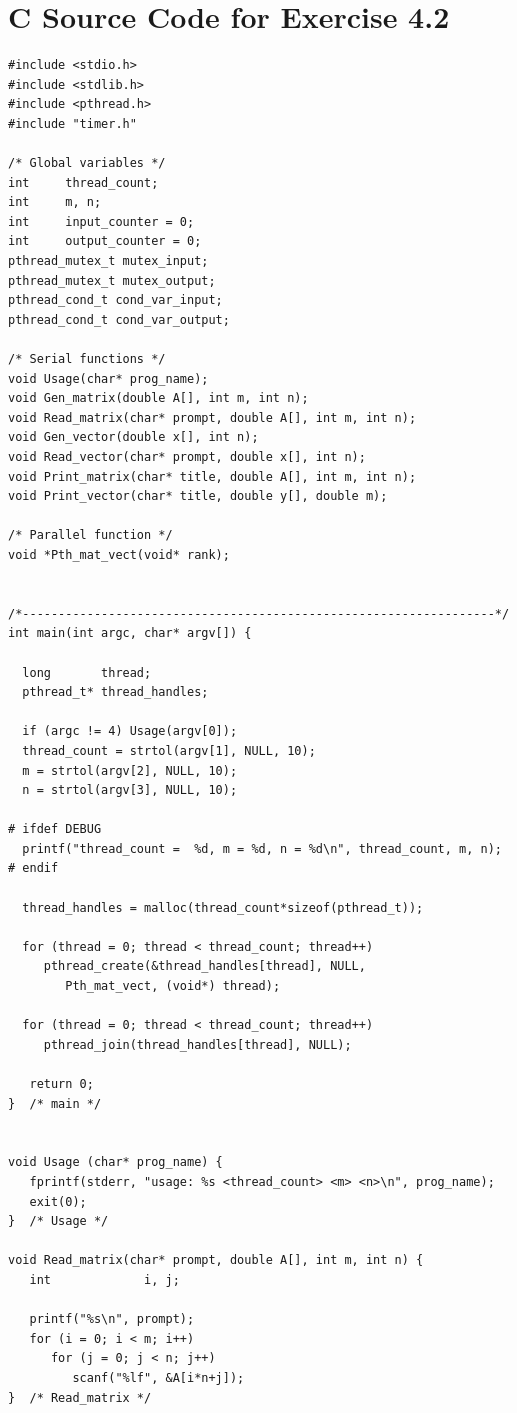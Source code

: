 \documentclass[a4paper,11pt,twoside]{article}
\begin{document}
\section{C Source Code for Exercise 4.2}{\label{app:source4.2}
\begin{verbatim}
#include <stdio.h>
#include <stdlib.h>
#include <pthread.h>
#include "timer.h"

/* Global variables */
int     thread_count;
int     m, n;
int     input_counter = 0;
int     output_counter = 0;
pthread_mutex_t mutex_input;
pthread_mutex_t mutex_output;
pthread_cond_t cond_var_input;
pthread_cond_t cond_var_output;

/* Serial functions */
void Usage(char* prog_name);
void Gen_matrix(double A[], int m, int n);
void Read_matrix(char* prompt, double A[], int m, int n);
void Gen_vector(double x[], int n);
void Read_vector(char* prompt, double x[], int n);
void Print_matrix(char* title, double A[], int m, int n);
void Print_vector(char* title, double y[], double m);

/* Parallel function */
void *Pth_mat_vect(void* rank);


/*------------------------------------------------------------------*/
int main(int argc, char* argv[]) {
  
  long       thread;
  pthread_t* thread_handles;

  if (argc != 4) Usage(argv[0]);
  thread_count = strtol(argv[1], NULL, 10);
  m = strtol(argv[2], NULL, 10);
  n = strtol(argv[3], NULL, 10);

# ifdef DEBUG
  printf("thread_count =  %d, m = %d, n = %d\n", thread_count, m, n);
# endif

  thread_handles = malloc(thread_count*sizeof(pthread_t));

  for (thread = 0; thread < thread_count; thread++)
     pthread_create(&thread_handles[thread], NULL,
        Pth_mat_vect, (void*) thread);

  for (thread = 0; thread < thread_count; thread++)
     pthread_join(thread_handles[thread], NULL);
  
   return 0;
}  /* main */


void Usage (char* prog_name) {
   fprintf(stderr, "usage: %s <thread_count> <m> <n>\n", prog_name);
   exit(0);
}  /* Usage */

void Read_matrix(char* prompt, double A[], int m, int n) {
   int             i, j;

   printf("%s\n", prompt);
   for (i = 0; i < m; i++) 
      for (j = 0; j < n; j++)
         scanf("%lf", &A[i*n+j]);
}  /* Read_matrix */



\end{verbatim}}
\end{document}
